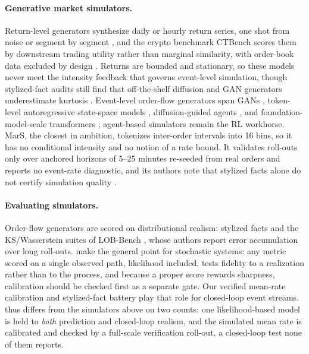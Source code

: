 \paragraph{Generative market simulators.}
Return-level generators synthesize daily or hourly return series, one shot
from noise or segment by segment \citep{huang2024ftsdiffusion}, and the
crypto benchmark CTBench scores them by downstream trading utility rather
than marginal similarity, with order-book data excluded by design
\citep{ang2026ctbench}. Returns are bounded and stationary, so these models
never meet the intensity feedback that governs event-level simulation,
though stylized-fact audits still find that off-the-shelf diffusion and
GAN generators underestimate kurtosis \citep{soun2026stable}.
Event-level order-flow generators span GANs
\citep{li2020stockgan,coletta2021lobgan,coletta2022worldagent}, token-level
autoregressive state-space models \citep{nagy2023lobs5}, diffusion-guided
agents \citep{huang2026diga}, and foundation-model-scale transformers
\citep{mars2025,sood2026tradefm}; agent-based simulators
\citep{byrd2020abides,frey2023jaxlob} remain the RL workhorse. MarS, the
closest in ambition, tokenizes inter-order intervals into 16 bins, so it
has no conditional intensity and no notion of a rate bound. It validates
roll-outs only over anchored horizons of 5--25 minutes re-seeded from real
orders and reports no event-rate diagnostic, and its authors note that
stylized facts alone do not certify simulation quality \citep{mars2025}.

\paragraph{Evaluating simulators.}
Order-flow generators are scored on distributional realism: stylized facts
\citep{cont2001empirical,vyetrenko2020getreal} and the KS/Wasserstein suites
of LOB-Bench \citep{nagy2025lobbench}, whose authors report error
accumulation over long roll-outs. \citet{kumar2025f2sp} make the general
point for stochastic systems: any metric scored on a single observed path,
likelihood included, tests fidelity to a realization rather than to the
process, and because a proper score rewards sharpness, calibration should
be checked first as a separate gate. Our verified mean-rate calibration and
stylized-fact battery play that role for closed-loop event streams. \ssppp{}
thus differs from the simulators above on two counts: one likelihood-based
model is held to \emph{both} prediction and closed-loop realism, and the
simulated mean rate is calibrated and checked by a full-scale verification
roll-out, a closed-loop test none of them reports.
